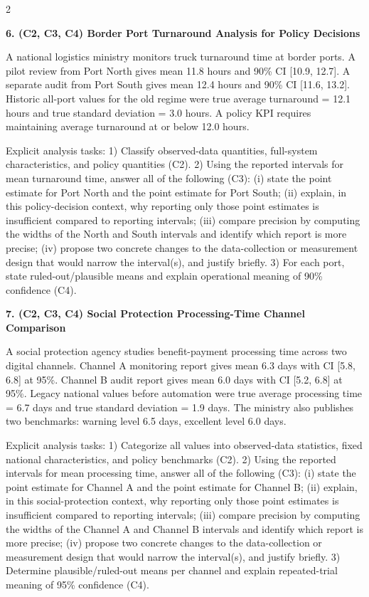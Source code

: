 \documentclass[12pt]{article}
\newcommand{\SubsectionBox}[1]{%
	\noindent\colorbox{gray!30}{%
		\parbox{\linewidth}{\textbf{#1}}%
	}\par\vspace{0.35cm}%
}
\begin{document}
\begin{multicols}{2}
		\vspace{0.25cm}
		\SubsectionBox{6. (C2, C3, C4) Border Port Turnaround Analysis for Policy Decisions}\vspace{-0.25cm}
		A national logistics ministry monitors truck turnaround time at border ports.
		A pilot review from Port North gives mean 11.8 hours and 90\% CI [10.9, 12.7].
		A separate audit from Port South gives mean 12.4 hours and 90\% CI [11.6, 13.2].
		Historic all-port values for the old regime were true average turnaround = 12.1 hours and true standard deviation = 3.0 hours.
		A policy KPI requires maintaining average turnaround at or below 12.0 hours.
		
		Explicit analysis tasks:
		1) Classify observed-data quantities, full-system characteristics, and policy quantities (C2).
		2) Using the reported intervals for mean turnaround time, answer all of the following (C3): (i) state the point estimate for Port North and the point estimate for Port South; (ii) explain, in this policy-decision context, why reporting only those point estimates is insufficient compared to reporting intervals; (iii) compare precision by computing the widths of the North and South intervals and identify which report is more precise; (iv) propose two concrete changes to the data-collection or measurement design that would narrow the interval(s), and justify briefly.
		3) For each port, state ruled-out/plausible means and explain operational meaning of 90\% confidence (C4).
		
		\vspace{0.25cm}
		\SubsectionBox{7. (C2, C3, C4) Social Protection Processing-Time Channel Comparison}\vspace{-0.25cm}
		A social protection agency studies benefit-payment processing time across two digital channels.
		Channel A monitoring report gives mean 6.3 days with CI [5.8, 6.8] at 95\%.
		Channel B audit report gives mean 6.0 days with CI [5.2, 6.8] at 95\%.
		Legacy national values before automation were true average processing time = 6.7 days and true standard deviation = 1.9 days.
		The ministry also publishes two benchmarks: warning level 6.5 days, excellent level 6.0 days.
		
		Explicit analysis tasks:
		1) Categorize all values into observed-data statistics, fixed national characteristics, and policy benchmarks (C2).
		2) Using the reported intervals for mean processing time, answer all of the following (C3): (i) state the point estimate for Channel A and the point estimate for Channel B; (ii) explain, in this social-protection context, why reporting only those point estimates is insufficient compared to reporting intervals; (iii) compare precision by computing the widths of the Channel A and Channel B intervals and identify which report is more precise; (iv) propose two concrete changes to the data-collection or measurement design that would narrow the interval(s), and justify briefly.
		3) Determine plausible/ruled-out means per channel and explain repeated-trial meaning of 95\% confidence (C4).
		

\end{multicols}
\end{document}

